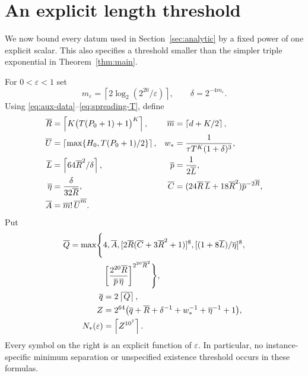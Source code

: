 \documentclass[11pt]{article}
\theoremstyle{remark}
\newcommand{\ceil}[1]{\left\lceil #1\right\rceil}
\begin{document}
\section{An explicit length threshold}\label{sec:threshold}

We now bound every datum used in Section~\ref{sec:analytic} by a fixed
power of one explicit scalar. This also specifies a threshold smaller than
the simpler triple exponential in Theorem~\ref{thm:main}.

For $0<\varepsilon<1$ set
\begin{equation}\label{eq:precision}
 m_\varepsilon=\ceil{2\log_2(2^{20}/\varepsilon)},\qquad
 \delta=2^{-4m_\varepsilon}.
\end{equation}
Using \eqref{eq:aux-data}--\eqref{eq:spreading-T}, define
\begin{align}
 \overline R&=\ceil{K\bigl(T(P_0+1)+1\bigr)^K},&
 \overline m&=\ceil{d+K/2},\notag\\
 \overline U&=\ceil{\max\{H_0,T(P_0+1)/2\}},&
 w_*&=\frac1{\tau T^K(1+\delta)^3},\notag\\
 \overline L&=\ceil{64\overline R^2/\delta},&
 \overline p&=\frac1{2\overline L},\notag\\
 \overline\eta&=\frac\delta{32\overline R},&
 \overline C&=(24\overline R\,\overline L+18\overline R^2)
                      \overline p^{-2\overline R},\notag\\
 \overline A&=\overline m!\,\overline U^{\overline m}.
                                                        \label{eq:master-data}
\end{align}
Put
\begin{align}
 \overline Q=\max\Biggl\{&4,\overline A,
       [2\overline R(\overline C+3\overline R^2+1)]^8,
       [(1+8\overline L)/\overline\eta]^8,\notag\\
       &\left[\frac{2^{20}\overline R}
                         {\overline p\,\overline\eta}\right]
                                      ^{2^{20}\overline R^2}\Biggr\},
                                                        \label{eq:Qbar}\\
 \overline q&=2\ceil{\overline Q},\notag\\
 Z&=2^{64}\bigl(\overline q+\overline R+\delta^{-1}
                        +w_*^{-1}+\overline\eta^{-1}+1\bigr),\notag\\
 N_*(\varepsilon)&=\ceil{Z^{10^7}}.                  \label{eq:Nstar}
\end{align}
Every symbol on the right is an explicit function of $\varepsilon$.
In particular, no instance-specific minimum separation or unspecified
existence threshold occurs in these formulas.
\end{document}

